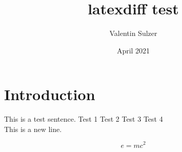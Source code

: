 \documentclass{article}
\title{latexdiff test}
\author{Valentin Sulzer}
\date{April 2021}
\begin{document}
\maketitle

\section{Introduction}

This is a test sentence.
Test 1
Test 2
Test 3
Test 4
\\This is a new line.

\begin{equation}
    e = mc^2
\end{equation}
\end{document}
